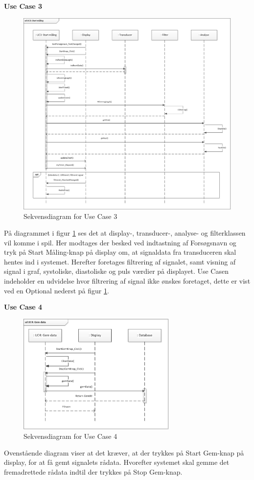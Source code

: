 \textbf{Use Case 3}
\begin{figure}[H]
	\centering
	\includegraphics[width=1.0\textwidth]{Figurer/UC3}
	\caption{Sekvensdiagram for Use Case 3}
	\label{fig:Sekvensdiagram_UC_3}
\end{figure}
På diagrammet i figur \ref{fig:Sekvensdiagram_UC_3} ses det at display-, transducer-, analyse- og filterklassen vil komme i spil. Her modtages der besked ved indtastning af Forsøgsnavn og tryk på Start Måling-knap på display om, at signaldata fra transduceren skal hentes ind i systemet. Herefter foretages filtrering af signalet, samt visning af signal i graf, systoliske, diastoliske og puls værdier på displayet. Use Casen indeholder en udvidelse hvor filtrering af signal ikke ønskes foretaget, dette er vist ved en Optional nederst på figur \ref{fig:Sekvensdiagram_UC_3}. 

\textbf{Use Case 4}
\begin{figure}[H]
	\centering
	\includegraphics[width=0.7\textwidth]{Figurer/UC4}
	\caption{Sekvensdiagram for Use Case 4}
	\label{fig:Sekvensdiagram_UC_4}
\end{figure}
Ovenstående diagram viser at det kræver, at der trykkes på Start Gem-knap på display, for at få gemt signalets rådata. Hvorefter systemet skal gemme det fremadrettede rådata indtil der trykkes på Stop Gem-knap.

